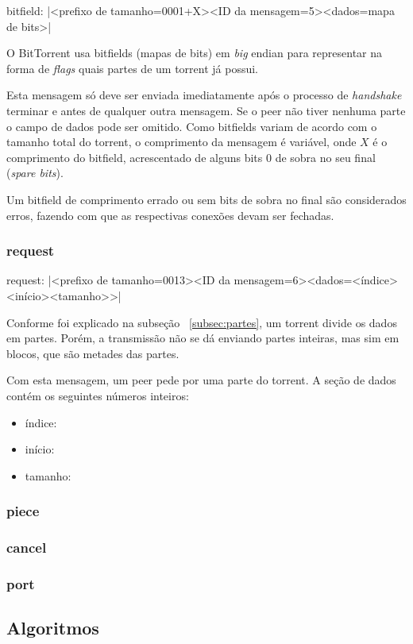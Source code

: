 bitfield: \bverb|<prefixo de tamanho=0001+X><ID da mensagem=5><dados=mapa de bits>|

O BitTorrent usa bitfields (mapas de bits) em \emph{big} \gls*{endian} para representar
na forma de \emph{flags} quais partes de um \gls*{torrent} já possui.

Esta mensagem só deve ser enviada imediatamente após o processo de \emph{handshake}
terminar e antes de qualquer outra mensagem. Se o \gls*{peer} não tiver nenhuma parte o
campo de dados pode ser omitido. Como bitfields variam de acordo com o tamanho total do
\gls*{torrent}, o comprimento da mensagem é variável, onde $X$ é o comprimento do
bitfield, acrescentado de alguns bits 0 de sobra no seu final (\emph{spare bits}).

Um bitfield de comprimento errado ou sem bits de sobra no final são considerados erros,
fazendo com que as respectivas conexões devam ser fechadas.

\subsubsection*{request}

request: \bverb|<prefixo de tamanho=0013><ID da mensagem=6><dados=<índice><início><tamanho>>|

Conforme foi explicado na subseção ~\ref{subsec:partes}, um \gls*{torrent} divide os
dados em partes. Porém, a transmissão não se dá enviando partes inteiras, mas sim
em blocos, que são metades das partes.

Com esta mensagem, um \gls*{peer} pede por uma parte do \gls*{torrent}. A seção de dados
contém os seguintes números inteiros:

\begin{itemize}
    \item índice:
    \item início:
    \item tamanho:
\end{itemize}

\subsubsection*{piece}

\subsubsection*{cancel}

\subsubsection*{port}


\subsection*{Algoritmos}